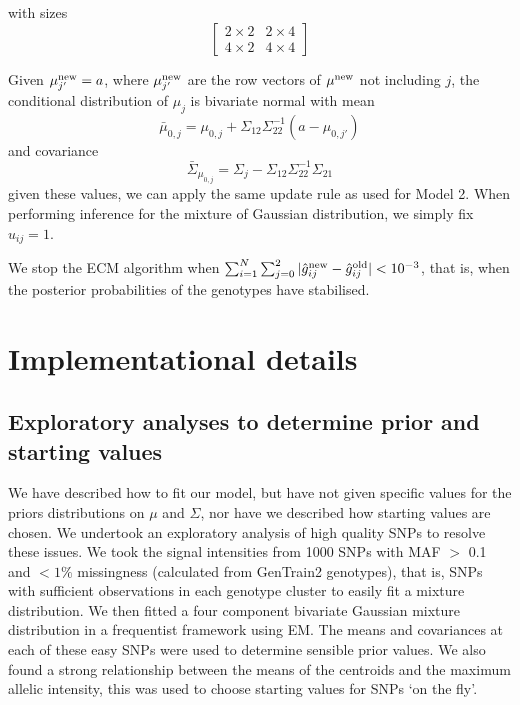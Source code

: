 with sizes \[ \left[ \begin{array}{cc} 2 \times 2 & 2 \times 4\\4 \times 2 & 4 \times 4\end{array} \right] \]

Given $\mu_{j'}^\textrm{new} = a$, where $\mu_{j'}^\textrm{new}$ are the row vectors of $\mu^\textrm{new}$ not including $j$, the conditional distribution of $\mu_j$ is bivariate normal with mean
$$\bar{\mu}_{0,j} = \mu_{0,j} + \Sigma_{12}\Sigma^{-1}_{22}(a - \mu_{0,j'})$$
and covariance
$$\bar{\Sigma}_{\mu_{0,j}} = \Sigma_j - \Sigma_{12}\Sigma^{-1}_{22}\Sigma_{21}$$
given these values, we can apply the same update rule as used for Model 2.  When performing inference for the mixture of Gaussian distribution, we simply fix $u_{ij}=1$.

We stop the ECM algorithm when $\sum_{i=1}^N \sum_{j=0}^2 |\hat{g}_{ij}^\textrm{new} - \hat{g}_{ij}^\textrm{old}| < 10^{-3}$, that is, when the posterior probabilities of the genotypes have stabilised.

\section{Implementational details}
\label{chap2:results}
\subsection{Exploratory analyses to determine prior and starting values}
\label{exploratory}
\label{chap2:results:exploratory}
We have described how to fit our model, but have not given specific values for the priors distributions on $\mu$ and $\Sigma$, nor have we described how starting values are chosen.  We undertook an exploratory analysis of high quality SNPs to resolve these issues. We took the signal intensities from 1000 SNPs with MAF $>$ 0.1 and $<1\%$ missingness (calculated from GenTrain2 genotypes), that is, SNPs with sufficient observations in each genotype cluster to easily fit a mixture distribution.  We then fitted a four component bivariate Gaussian mixture distribution in a frequentist framework using EM. The means and covariances at each of these easy SNPs were used to determine sensible prior values.  We also found a strong relationship between the means of the centroids and the maximum allelic intensity, this was used to choose starting values for SNPs `on the fly'.
